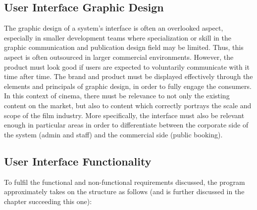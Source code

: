 \documentclass[11pt, english]{article}
\begin{document}
	\subsection{User Interface Graphic Design}

	The graphic design of a system's interface is often an overlooked aspect, especially in smaller development teams where specialization or skill in the graphic communication and publication design field may be limited. Thus, this aspect is often outsourced in larger commercial environments. However, the product must look good if users are expected to voluntarily communicate with it time after time. The brand and product must be displayed effectively through the elements and principals of graphic design, in order to fully engage the consumers.\\

	In this context of cinema, there must be relevance to not only the existing content on the market, but also to content which correctly portrays the scale and scope of the film industry. More specifically, the interface must also be relevant enough in particular areas in order to differentiate between the corporate side of the system (admin and staff) and the commercial side (public booking). 

	\subsection{User Interface Functionality}

	To fulfil the functional and non-functional requirements discussed, the program approximately takes on the structure as follows (and is further discussed in the chapter succeeding this one):
\end{document}
